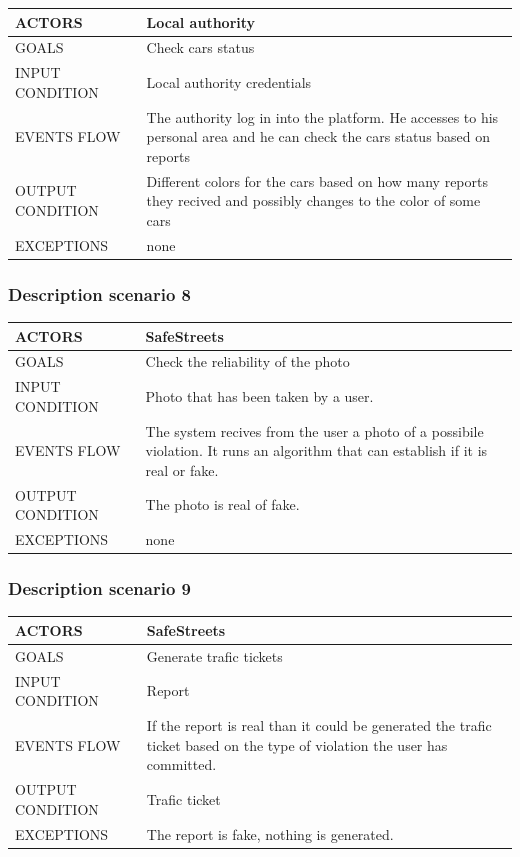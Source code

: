 \begin{center}
	\begin{tabular}{ | l | p{6cm} | } 
		\hline
		ACTORS & Local authority  \\ 
		\hline
		GOALS & Check cars status  \\ 
		\hline
		INPUT CONDITION & Local authority credentials  \\ 
		\hline
		EVENTS FLOW & The authority log in into the platform. He accesses to his personal area and he can check the cars status based on reports \\ 
		\hline
		OUTPUT CONDITION & Different colors for the cars based on how many reports they recived and possibly changes to the color of some cars \\ 
		\hline
		EXCEPTIONS & none \\ 
		\hline
	\end{tabular}
\end{center}

\subsubsection{Description scenario 8}

\begin{center}
	\begin{tabular}{ | l | p{6cm} | } 
		\hline
		ACTORS & SafeStreets  \\ 
		\hline
		GOALS & Check the reliability of the photo  \\ 
		\hline
		INPUT CONDITION & Photo that has been taken by a user.  \\ 
		\hline
		EVENTS FLOW & The system recives from the user a photo of a possibile violation. It runs an algorithm that can establish if it is real or fake. \\ 
		\hline
		OUTPUT CONDITION & The photo is real of fake. \\ 
		\hline
		EXCEPTIONS & none \\ 
		\hline
	\end{tabular}
\end{center}

\subsubsection{Description scenario 9}

\begin{center}
	\begin{tabular}{ | l | p{6cm} | } 
		\hline
		ACTORS & SafeStreets  \\ 
		\hline
		GOALS & Generate trafic tickets  \\ 
		\hline
		INPUT CONDITION & Report  \\ 
		\hline
		EVENTS FLOW & If the report is real than it could be generated the trafic ticket based on the type of violation the user has committed. \\ 
		\hline
		OUTPUT CONDITION & Trafic ticket \\ 
		\hline
		EXCEPTIONS & The report is fake, nothing is generated. \\ 
		\hline
	\end{tabular}
\end{center}
\newpage

